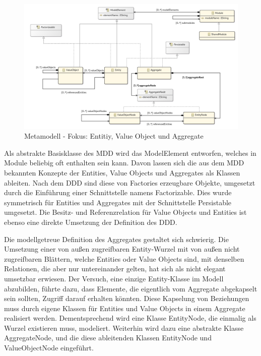 \newpage

\begin{figure}[ht]
\centering
\includegraphics[width=\textwidth]{bilder/k4/2.png}
\caption{Metamodell - Fokus: Entitiy, Value Object und Aggregate}
\end{figure}

Als abstrakte Basisklasse des MDD wird das ModelElement entworfen, welches in Module beliebig oft enthalten sein kann. Davon lassen sich die aus dem MDD bekannten Konzepte der Entities, Value Objects und Aggregates als Klassen ableiten. Nach dem DDD sind diese von Factories erzeugbare Objekte, umgesetzt durch die Einführung einer Schnittstelle namens \glqq Factorizable\grqq{}. Dies wurde symmetrisch für Entities und Aggregates mit der Schnittstelle \glqq Persistable\grqq{} umgesetzt. Die Besitz- und Referenzrelation für Value Objects und Entities ist ebenso eine direkte Umsetzung der Definition des DDD.

Die modellgetreue Definition des Aggregates gestaltet sich schwierig. Die Umsetzung einer von außen zugreifbaren Entity-Wurzel mit von außen nicht zugreifbaren Blättern, welche Entities oder Value Objects sind, mit denselben Relationen, die aber nur untereinander gelten, hat sich als nicht elegant umsetzbar erwiesen. Der Versuch, eine einzige Entity-Klasse im Modell abzubilden, führte dazu, dass Elemente, die eigentlich vom Aggregate abgekapselt sein sollten, Zugriff darauf erhalten könnten. Diese Kapselung von Beziehungen muss durch eigene Klassen für Entities und Value Objects in einem Aggregate realisiert werden. Dementsprechend wird eine Klasse \glqq EntityNode\grqq{}, die einmalig als Wurzel existieren muss, modeliert. Weiterhin wird dazu eine abstrakte Klasse \glqq AggregateNode\grqq{}, und die diese ableitenden Klassen \glqq EntityNode\grqq{} und \glqq ValueObjectNode\grqq{} eingeführt.

